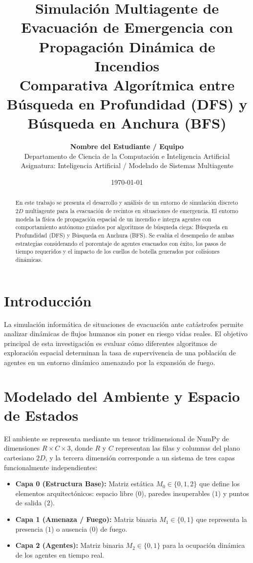 \documentclass[11pt, a4paper]{article}
\title{\textbf{Simulación Multiagente de Evacuación de Emergencia con Propagación Dinámica de Incendios}\\
\large Comparativa Algorítmica entre Búsqueda en Profundidad (DFS) y Búsqueda en Anchura (BFS)}
\author{\textbf{Nombre del Estudiante / Equipo}\\
\small Departamento de Ciencia de la Computación e Inteligencia Artificial\\
\small Asignatura: Inteligencia Artificial / Modelado de Sistemas Multiagente}
\date{\today}
\begin{document}
\maketitle

\begin{abstract}
En este trabajo se presenta el desarrollo y análisis de un entorno de simulación discreto $2D$ multiagente para la evacuación de recintos en situaciones de emergencia. El entorno modela la física de propagación espacial de un incendio e integra agentes con comportamiento autónomo guiados por algoritmos de búsqueda ciega: Búsqueda en Profundidad (DFS) y Búsqueda en Anchura (BFS). Se evalúa el desempeño de ambas estrategias considerando el porcentaje de agentes evacuados con éxito, los pasos de tiempo requeridos y el impacto de los cuellos de botella generados por colisiones dinámicas.
\end{abstract}

\section{Introducción}
La simulación informática de situaciones de evacuación ante catástrofes permite analizar dinámicas de flujos humanos sin poner en riesgo vidas reales. El objetivo principal de esta investigación es evaluar cómo diferentes algoritmos de exploración espacial determinan la tasa de supervivencia de una población de agentes en un entorno dinámico amenazado por la expansión de fuego.

\section{Modelado del Ambiente y Espacio de Estados}
El ambiente se representa mediante un tensor tridimensional de NumPy de dimensiones $R \times C \times 3$, donde $R$ y $C$ representan las filas y columnas del plano cartesiano $2D$, y la tercera dimensión corresponde a un sistema de tres capas funcionalmente independientes:

\begin{itemize}
    \item \textbf{Capa 0 (Estructura Base):} Matriz estática $M_0 \in \{0, 1, 2\}$ que define los elementos arquitectónicos: espacio libre ($0$), paredes insuperables ($1$) y puntos de salida ($2$).
    \item \textbf{Capa 1 (Amenaza / Fuego):} Matriz binaria $M_1 \in \{0, 1\}$ que representa la presencia ($1$) o ausencia ($0$) de fuego.
    \item \textbf{Capa 2 (Agentes):} Matriz binaria $M_2 \in \{0, 1\}$ para la ocupación dinámica de los agentes en tiempo real.
\end{itemize}
\end{document}
